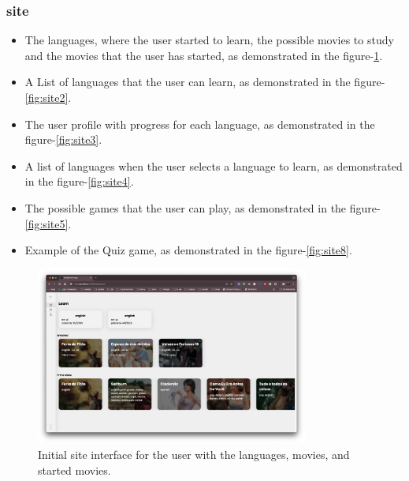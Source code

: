 \documentclass[12pt]{article}
\begin{document}
\subsubsection{site}
\begin{itemize}
\item The languages, where the user started to learn, the possible movies to study and the movies that the user has started, as demonstrated in the figure-\ref{fig:site1}.
\item A List of languages that the user can learn, as demonstrated in the figure-\ref{fig:site2}.
\item The user profile with progress for each language, as demonstrated in the figure-\ref{fig:site3}.
\item A list of languages when the user selects a language to learn, as demonstrated in the figure-\ref{fig:site4}.
\item The possible games that the user can play, as demonstrated in the figure-\ref{fig:site5}.
\item Example of the Quiz game, as demonstrated in the figure-\ref{fig:site8}.
\end{itemize}
  \begin{figure}[!h]
   \centering
   \caption{
   Initial site interface for the user with the languages, movies, and started movies.
    }
   \label{fig:site1}
   \includegraphics[width=0.8\textwidth]{assets/20.png}
  \end{figure}
\end{document}
